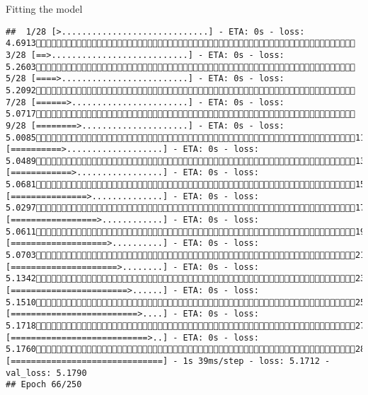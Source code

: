 \documentclass[
  ignorenonframetext,
]{beamer}
\begin{document}
\begin{frame}[fragile]{Fitting the model}
\begin{verbatim}
##  1/28 [>.............................] - ETA: 0s - loss: 4.6913 3/28 [==>...........................] - ETA: 0s - loss: 5.2603 5/28 [====>.........................] - ETA: 0s - loss: 5.2092 7/28 [======>.......................] - ETA: 0s - loss: 5.0717 9/28 [========>.....................] - ETA: 0s - loss: 5.008511/28 [==========>...................] - ETA: 0s - loss: 5.048913/28 [============>.................] - ETA: 0s - loss: 5.068115/28 [===============>..............] - ETA: 0s - loss: 5.029717/28 [=================>............] - ETA: 0s - loss: 5.061119/28 [===================>..........] - ETA: 0s - loss: 5.070321/28 [=====================>........] - ETA: 0s - loss: 5.134223/28 [=======================>......] - ETA: 0s - loss: 5.151025/28 [=========================>....] - ETA: 0s - loss: 5.171827/28 [===========================>..] - ETA: 0s - loss: 5.176028/28 [==============================] - 1s 39ms/step - loss: 5.1712 - val_loss: 5.1790
## Epoch 66/250

\end{verbatim}
\end{frame}
\end{document}

